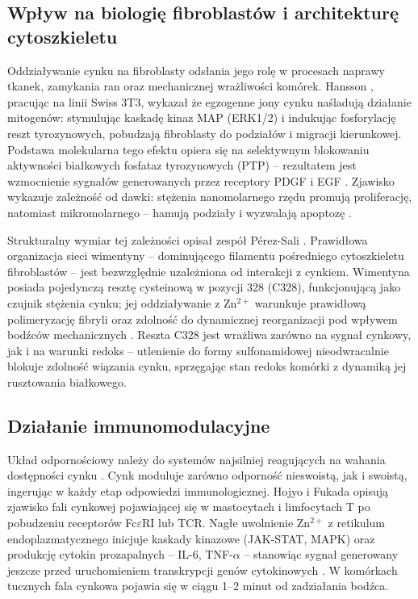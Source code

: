 \documentclass[12pt,a4paper]{article}
\begin{document}
\subsection{Wpływ na biologię fibroblastów i architekturę cytoszkieletu}

Oddziaływanie cynku na fibroblasty odsłania jego rolę w procesach naprawy tkanek, zamykania ran oraz mechanicznej wrażliwości komórek. Hansson \cite{hansson1996}, pracując na linii Swiss 3T3, wykazał że egzogenne jony cynku naśladują działanie mitogenów: stymulując kaskadę kinaz MAP (ERK1/2) i indukując fosforylację reszt tyrozynowych, pobudzają fibroblasty do podziałów i migracji kierunkowej. Podstawa molekularna tego efektu opiera się na selektywnym blokowaniu aktywności białkowych fosfataz tyrozynowych (PTP) -- rezultatem jest wzmocnienie sygnałów generowanych przez receptory PDGF i EGF \cite{hansson1996}. Zjawisko wykazuje zależność od dawki: stężenia nanomolarnego rzędu promują proliferację, natomiast mikromolarnego -- hamują podziały i wyzwalają apoptozę \cite{hansson1996, hernandezcamacho2020}.

Strukturalny wymiar tej zależności opisał zespół Pérez-Sali \cite{perezsala2015}. Prawidłowa organizacja sieci wimentyny -- dominującego filamentu pośredniego cytoszkieletu fibroblastów -- jest bezwzględnie uzależniona od interakcji z cynkiem. Wimentyna posiada pojedynczą resztę cysteinową w pozycji 328 (C328), funkcjonującą jako czujnik stężenia cynku; jej oddziaływanie z Zn\(^{2+}\) warunkuje prawidłową polimeryzację fibryli oraz zdolność do dynamicznej reorganizacji pod wpływem bodźców mechanicznych \cite{perezsala2015}. Reszta C328 jest wrażliwa zarówno na sygnał cynkowy, jak i na warunki redoks -- utlenienie do formy sulfonamidowej nieodwracalnie blokuje zdolność wiązania cynku, sprzęgając stan redoks komórki z dynamiką jej rusztowania białkowego.

\subsection{Działanie immunomodulacyjne}

Układ odpornościowy należy do systemów najsilniej reagujących na wahania dostępności cynku \cite{wessels2017}. Cynk moduluje zarówno odporność nieswoistą, jak i swoistą, ingerując w każdy etap odpowiedzi immunologicznej. Hojyo i Fukada \cite{hojyo2016} opisują zjawisko fali cynkowej pojawiającej się w mastocytach i limfocytach T po pobudzeniu receptorów Fc\(\varepsilon\)RI lub TCR. Nagłe uwolnienie Zn\(^{2+}\) z retikulum endoplazmatycznego inicjuje kaskady kinazowe (JAK-STAT, MAPK) oraz produkcję cytokin prozapalnych -- IL-6, TNF-$\alpha$ -- stanowiąc sygnał generowany jeszcze przed uruchomieniem transkrypcji genów cytokinowych \cite{hojyo2016}. W komórkach tucznych fala cynkowa pojawia się w ciągu 1--2 minut od zadziałania bodźca.
\end{document}

